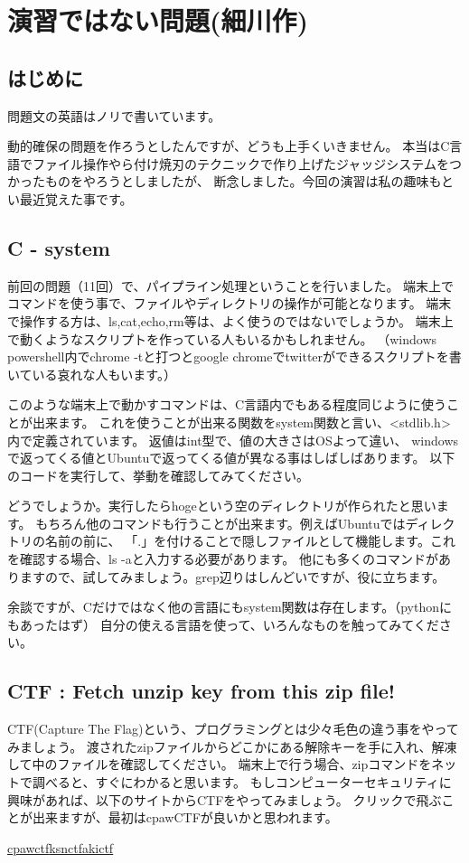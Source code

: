 \section{演習ではない問題(細川作)}
	\subsection{はじめに}
		問題文の英語はノリで書いています。
		
		動的確保の問題を作ろうとしたんですが、どうも上手くいきません。
		本当はC言語でファイル操作やら付け焼刃のテクニックで作り上げたジャッジシステムをつかったものをやろうとしましたが、
		断念しました。今回の演習は私の趣味もとい最近覚えた事です。
		
	\subsection{C - system}
		前回の問題（11回）で、パイプライン処理ということを行いました。
		端末上でコマンドを使う事で、ファイルやディレクトリの操作が可能となります。
		端末で操作する方は、ls,cat,echo,rm等は、よく使うのではないでしょうか。
		端末上で動くようなスクリプトを作っている人もいるかもしれません。
		（windows powershell内でchrome -tと打つとgoogle chromeでtwitterができるスクリプトを書いている哀れな人もいます。）
		
		このような端末上で動かすコマンドは、C言語内でもある程度同じように使うことが出来ます。
		これを使うことが出来る関数をsystem関数と言い、<stdlib.h>内で定義されています。
		返値はint型で、値の大きさはOSよって違い、
		windowsで返ってくる値とUbuntuで返ってくる値が異なる事はしばしばあります。
		以下のコードを実行して、挙動を確認してみてください。
		
		
		
		どうでしょうか。実行したらhogeという空のディレクトリが作られたと思います。
		もちろん他のコマンドも行うことが出来ます。例えばUbuntuではディレクトリの名前の前に、
		「.」を付けることで隠しファイルとして機能します。これを確認する場合、ls -aと入力する必要があります。
		他にも多くのコマンドがありますので、試してみましょう。grep辺りはしんどいですが、役に立ちます。
		
		余談ですが、Cだけではなく他の言語にもsystem関数は存在します。（pythonにもあったはず）
		自分の使える言語を使って、いろんなものを触ってみてください。
		
	\subsection{CTF : Fetch unzip key from this zip file!}
		CTF(Capture The Flag)という、プログラミングとは少々毛色の違う事をやってみましょう。
		渡されたzipファイルからどこかにある解除キーを手に入れ、解凍して中のファイルを確認してください。
		端末上で行う場合、zipコマンドをネットで調べると、すぐにわかると思います。
		もしコンピューターセキュリティに興味があれば、以下のサイトからCTFをやってみましょう。
		クリックで飛ぶことが出来ますが、最初はcpawCTFが良いかと思われます。
		
		\noindent
		[1]\href{https://ctf.cpaw.site/}{cpawctf}\newline
		[2]\href{http://ksnctf.sweetduet.info/}{ksnctf}\newline
		[3]\href{https://ctf.katsudon.org/}{akictf}\newline
